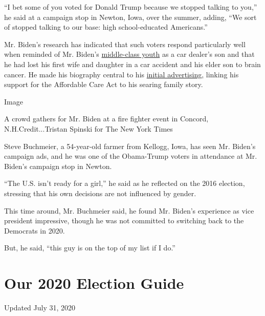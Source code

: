 ``I bet some of you voted for Donald Trump because we stopped talking to
you,'' he said at a campaign stop in Newton, Iowa, over the summer,
adding, ``We sort of stopped talking to our base: high school-educated
Americans.''

Mr. Biden's research has indicated that such voters respond particularly
well when reminded of Mr. Biden's
\href{https://www.nytimes.com/2008/10/24/us/politics/24biden.html}{middle-class
youth} as a car dealer's son and that he had lost his first wife and
daughter in a car accident and his elder son to brain cancer. He made
his biography central to his
\href{https://www.nytimes.com/2019/08/27/us/politics/joe-biden-ad-personal.html}{initial
advertising}, linking his support for the Affordable Care Act to his
searing family story.

Image

A crowd gathers for Mr. Biden at a fire fighter event in Concord,
N.H.Credit...Tristan Spinski for The New York Times

Steve Buchmeier, a 54-year-old farmer from Kellogg, Iowa, has seen Mr.
Biden's campaign ads, and he was one of the Obama-Trump voters in
attendance at Mr. Biden's campaign stop in Newton.

``The U.S. isn't ready for a girl,'' he said as he reflected on the 2016
election, stressing that his own decisions are not influenced by gender.

This time around, Mr. Buchmeier said, he found Mr. Biden's experience as
vice president impressive, though he was not committed to switching back
to the Democrats in 2020.

But, he said, ``this guy is on the top of my list if I do.''

\hypertarget{our-2020-election-guide}{%
\section{Our 2020 Election Guide}\label{our-2020-election-guide}}

Updated July 31, 2020


